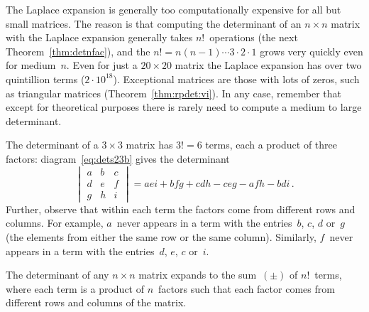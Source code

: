 \begin{example}
\begin{enumerate}
\end{enumerate}
\end{example}








The Laplace expansion is generally too computationally expensive for all but small matrices.
The reason is that computing the determinant of an \(n\times n\) matrix with the Laplace expansion generally takes \(n!\)~operations (the next Theorem~\ref{thm:detnfac}), and the  \(n!=n(n-1)\cdots3\cdot2\cdot1\) grows very quickly even for medium~\(n\).
Even for just a \(20\times20\) matrix the Laplace expansion has over two quintillion terms (\(2\cdot10^{18}\)).
Exceptional matrices are those with lots of zeros, such as triangular matrices (Theorem~\ref{thm:rpdet:vi}).
In any case, remember that except for theoretical purposes there is rarely need to compute a medium to large determinant.



\begin{example} \label{eg:}
The determinant of a \(3\times3\) matrix has \(3!=6\) terms, each a product of three factors:
diagram~\eqref{eq:dets23b} gives the determinant
\begin{equation*}
\begin{vmatrix} a&b&c\\d&e&f\\g&h&i \end{vmatrix}=aei+bfg+cdh-ceg-afh-bdi\,.
\end{equation*}
Further, observe that within each term the factors come from different rows and columns.
For example, \(a\)~never appears in a term with the entries~\(b\), \(c\), \(d\) or~\(g\) (the elements from either the same row or the same column).
Similarly, \(f\)~never appears in a term with the entries~\(d\), \(e\), \(c\) or~\(i\).
\end{example}



\begin{theorem} \label{thm:detnfac}
The determinant of any \(n\times n\) matrix expands to the sum~\((\pm)\) of \(n!\)~terms, where each term is a product of \(n\)~factors such that each factor comes from different rows and columns of the matrix.
\end{theorem}

